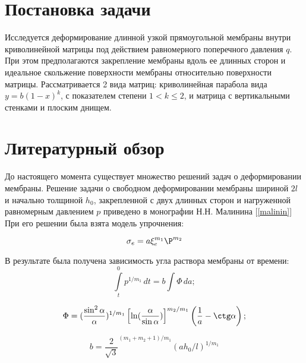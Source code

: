 \section{Постановка задачи}
Исследуется деформирование длинной узкой прямоугольной мембраны внутри криволинейной матрицы под действием равномерного поперечного 
давления $q$. При этом предполагаются закрепление мембраны вдоль ее длинных сторон и идеальное скольжение поверхности мембраны относительно поверхности матрицы.
Рассматривается 2 вида матриц: криволинейная парабола вида $y = b(1-x)^k$, с показателем степени $1<k \leqslant 2$, и матрица с вертикальными стенками и плоским днищем.

\section{Литературный обзор}

До настоящего момента существует множество решений задач о деформировании мембраны.
Решение задачи о свободном деформировании мембраны шириной $2l$ и начально толщиной $h_0$, закрепленной с двух длинных сторон и нагруженной равномерным давлением $p$ приведено в монографии Н.Н. Малинина [\ref{malinin}] 
При его решении была взята модель упрочнения:

$$\sigma_e = a\xi_e^{m_1}\P^{m_2}$$

В результате была получена зависимость угла раствора мембраны от времени:
$$\int\limits^0_tp^{1/m_1}\,dt = b\int\limits\Phi\,da;$$

$$\Phi  = (\dfrac{\sin^2\alpha}{\alpha})^{1/m_1}\left[\ln(\dfrac{\alpha}{\sin\alpha})\right]^{m_2/m_1}
\left(\dfrac{1}{a} - \ctg \alpha \right);$$

$$ b = \dfrac{2}{\sqrt 3}^{(m_1+m_2+1)/m_1}(ah_0/l)^{1/m_1}$$


\newpage
